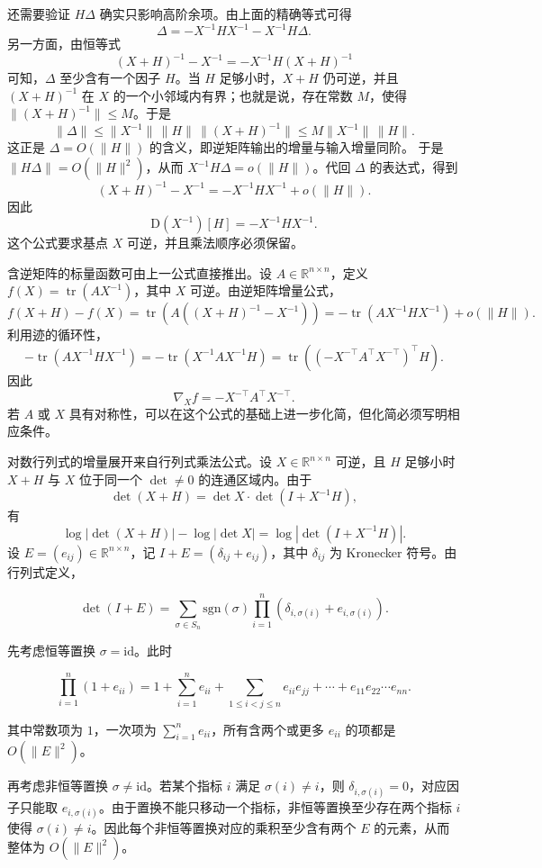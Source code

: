 还需要验证 \(H\Delta\) 确实只影响高阶余项。由上面的精确等式可得
\[
\Delta=-X^{-1}HX^{-1}-X^{-1}H\Delta.
\]
另一方面，由恒等式
\[
(X+H)^{-1}-X^{-1}=-X^{-1}H(X+H)^{-1}
\]
可知，\(\Delta\) 至少含有一个因子 \(H\)。当 \(H\) 足够小时，\(X+H\) 仍可逆，并且 \((X+H)^{-1}\) 在 \(X\) 的一个小邻域内有界；也就是说，存在常数 \(M\)，使得 \(\|(X+H)^{-1}\|\le M\)。于是
\[
\|\Delta\|
\le \|X^{-1}\|\,\|H\|\,\|(X+H)^{-1}\|
\le M\|X^{-1}\|\,\|H\|.
\]
这正是 \(\Delta=O(\|H\|)\) 的含义，即逆矩阵输出的增量与输入增量同阶。
于是 \(\|H\Delta\|=O(\|H\|^2)\)，从而 \(X^{-1}H\Delta=o(\|H\|)\)。代回 \(\Delta\) 的表达式，得到
\[
(X+H)^{-1}-X^{-1}=-X^{-1}HX^{-1}+o(\|H\|).
\]
因此
\[
\mathrm{D}(X^{-1})[H]=-X^{-1}HX^{-1}.
\]
这个公式要求基点 \(X\) 可逆，并且乘法顺序必须保留。

含逆矩阵的标量函数可由上一公式直接推出。设 \(A\in\mathbb{R}^{n\times n}\)，定义 \(f(X)=\operatorname{tr}(A X^{-1})\)，其中 \(X\) 可逆。由逆矩阵增量公式，
\[
f(X+H)-f(X)=\operatorname{tr}(A((X+H)^{-1}-X^{-1}))
=-\operatorname{tr}(A X^{-1}H X^{-1})+o(\|H\|).
\]
利用迹的循环性，
\[
-\operatorname{tr}(A X^{-1}H X^{-1})
=-\operatorname{tr}(X^{-1}A X^{-1}H)
=\operatorname{tr}((-X^{-\top}A^\top X^{-\top})^\top H).
\]
因此
\[
\nabla_X f=-X^{-\top}A^\top X^{-\top}.
\]
若 \(A\) 或 \(X\) 具有对称性，可以在这个公式的基础上进一步化简，但化简必须写明相应条件。

对数行列式的增量展开来自行列式乘法公式。设 \(X\in\mathbb{R}^{n\times n}\) 可逆，且 \(H\) 足够小时 \(X+H\) 与 \(X\) 位于同一个 \(\det\ne0\) 的连通区域内。由于
\[
\det(X+H)=\det X\cdot \det(I+X^{-1}H),
\]
有
\[
\log|\det(X+H)|-\log|\det X|=\log|\det(I+X^{-1}H)|.
\]
设 $E=(e_{ij})\in\mathbb{R}^{n\times n}$，记 $I+E=(\delta_{ij}+e_{ij})$，其中 $\delta_{ij}$ 为 Kronecker 符号。由行列式定义，

$$
\det(I+E)
=\sum_{\sigma\in S_n}\text{sgn}(\sigma)
\prod_{i=1}^n(\delta_{i,\sigma(i)}+e_{i,\sigma(i)}).
$$

先考虑恒等置换 $\sigma=\mathrm{id}$。此时

$$
\prod_{i=1}^n(1+e_{ii})
=1+\sum_{i=1}^n e_{ii}
+\sum_{1\le i<j\le n}e_{ii}e_{jj}
+\cdots
+e_{11}e_{22}\cdots e_{nn}.
$$

其中常数项为 $1$，一次项为 $\sum_{i=1}^n e_{ii}$，所有含两个或更多 $e_{ii}$ 的项都是 $O(\|E\|^2)$。

再考虑非恒等置换 $\sigma\ne\mathrm{id}$。若某个指标 $i$ 满足 $\sigma(i)\ne i$，则 $\delta_{i,\sigma(i)}=0$，对应因子只能取 $e_{i,\sigma(i)}$。由于置换不能只移动一个指标，非恒等置换至少存在两个指标 $i$ 使得 $\sigma(i)\ne i$。因此每个非恒等置换对应的乘积至少含有两个 $E$ 的元素，从而整体为 $O(\|E\|^2)$。

